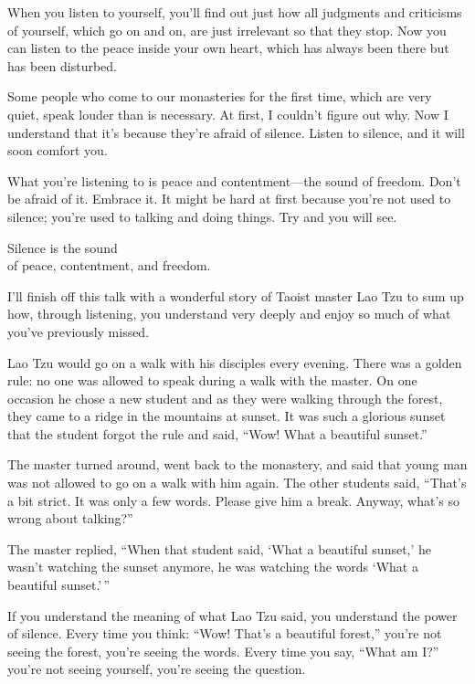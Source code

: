 \documentclass[12pt, openany]{book}
\newenvironment{aphorism}%
{%
\begin{center}\begin{itshape}
}%
{\end{itshape}\end{center}
}%
\begin{document}
When you listen to yourself, you’ll find out just how all judgments and criticisms of yourself, which go on and on, are just irrelevant so that they stop. Now you can listen to the peace inside your own heart, which has always been there but has been disturbed. 

Some people who come to our monasteries for the first time, which are very quiet, speak louder than is necessary. At first, I couldn’t figure out why. Now I understand that it’s because they’re afraid of silence. Listen to silence, and it will soon comfort you. 

What you’re listening to is peace and contentment—the sound of freedom. Don’t be afraid of it. Embrace it. It might be hard at first because you’re not used to silence; you’re used to talking and doing things. Try and you will see. 

\begin{aphorism}
Silence is the sound \\
of peace, contentment, and freedom.
\end{aphorism}

I’ll finish off this talk with a wonderful story of Taoist master Lao Tzu to sum up how, through listening, you understand very deeply and enjoy so much of what you’ve previously missed. 

Lao Tzu would go on a walk with his disciples every evening. There was a golden rule: no one was allowed to speak during a walk with the master. On one occasion he chose a new student and as they were walking through the forest, they came to a ridge in the mountains at sunset. It was such a glorious sunset that the student forgot the rule and said, “Wow! What a beautiful sunset.” 

The master turned around, went back to the monastery, and said that young man was not allowed to go on a walk with him again. The other students said, “That’s a bit strict. It was only a few words. Please give him a break. Anyway, what’s so wrong about talking?” 

The master replied, “When that student said, ‘What a beautiful sunset,’ he wasn’t watching the sunset anymore, he was watching the words ‘What a beautiful sunset.’\,” 

If you understand the meaning of what Lao Tzu said, you understand the power of silence. Every time you think: “Wow! That’s a beautiful forest,” you’re not seeing the forest, you’re seeing the words. Every time you say, “What am I?” you’re not seeing yourself, you’re seeing the question. 
\end{document}
